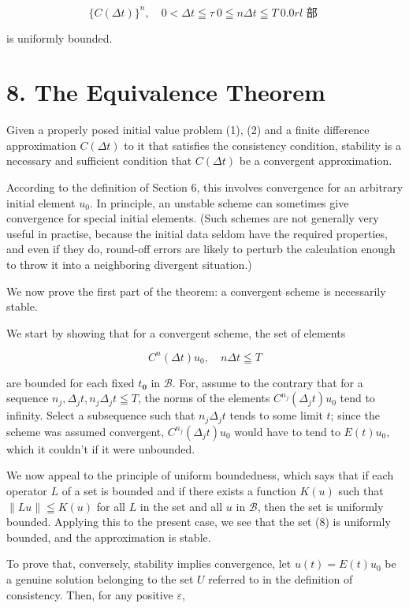 \documentclass[10pt]{article}
\begin{document}
\[
\{C(\Delta t)\}^{n}, \quad 0<\Delta t \leqq \tau ~ 0 \leqq n \Delta t \leqq T ~ 0.0 r l \text { 部 }
\]

is uniformly bounded.

\section*{8. The Equivalence Theorem}
Given a properly posed initial value problem (1), (2) and a finite difference approximation \(C(\Delta t)\) to it that satisfies the consistency condition, stability is a necessary and sufficient condition that \(C(\Delta t)\) be a convergent approximation.

According to the definition of Section 6, this involves convergence for an arbitrary initial element \(u_{0}\). In principle, an unstable scheme can sometimes give convergence for special initial elements. (Such schemes are not generally very useful in practise, because the initial data seldom have the required properties, and even if they do, round-off errors are likely to perturb the calculation enough to throw it into a neighboring divergent situation.)

We now prove the first part of the theorem: a convergent scheme is necessarily stable.

We start by showing that for a convergent scheme, the set of elements

\[
C^{n}(\Delta t) u_{0}, \quad n \Delta t \leqq T
\]

are bounded for each fixed \(t_{\mathbf{0}}\) in \(\mathscr{B}\). For, assume to the contrary that for a sequence \(n_{j}, \Delta_{j} t, n_{j} \Delta_{j} t \leqq T\), the norms of the elements \(C^{n_{j}}\left(\Delta_{j} t\right) u_{0}\) tend to infinity. Select a subsequence such that \(n_{j} \Delta_{j} t\) tends to some limit \(t\); since the scheme was assumed convergent, \(C^{n_{j}}\left(\Delta_{j} t\right) u_{0}\) would have to tend to \(E(t) u_{0}\), which it couldn't if it were unbounded.

We now appeal to the principle of uniform boundedness, which says that if each operator \(L\) of a set is bounded and if there exists a function \(K(u)\) such that \(\|L u\| \leqq K(u)\) for all \(L\) in the set and all \(u\) in \(\mathscr{B}\), then the set is uniformly bounded. Applying this to the present case, we see that the set (8) is uniformly bounded, and the approximation is stable.

To prove that, conversely, stability implies convergence, let \(u(t)=E(t) u_{0}\) be a genuine solution belonging to the set \(U\) referred to in the definition of consistency. Then, for any positive \(\varepsilon\),
\end{document}
